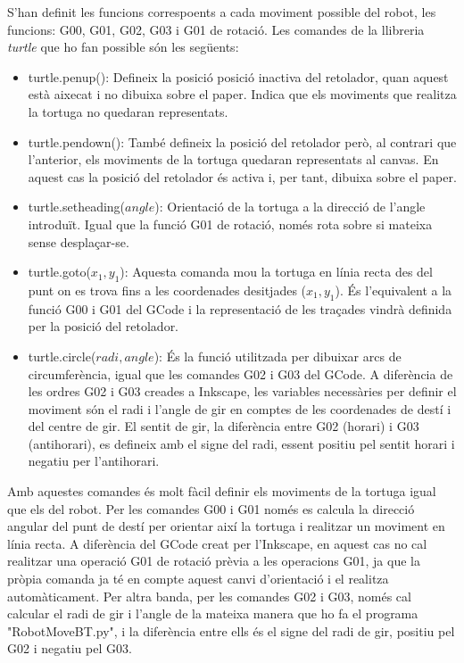 S'han definit les funcions correspoents a cada moviment possible del robot, les funcions: G00, G01, G02, G03 i G01 de rotació. Les comandes de la llibreria \emph{turtle} que ho fan possible són les següents:
\begin{itemize}
	\item turtle.penup(): Defineix la posició posició inactiva del retolador, quan aquest està aixecat i no dibuixa sobre el paper. Indica que els moviments que realitza la tortuga no quedaran representats. 
	
	\item turtle.pendown(): També defineix la posició del retolador però, al contrari que l'anterior, els moviments de la tortuga quedaran representats al canvas. En aquest cas la posició del retolador és activa i, per tant, dibuixa sobre el paper.
	
	\item turtle.setheading($angle$): Orientació de la tortuga a la direcció de l'angle introduït. Igual que la funció G01 de rotació, només rota sobre si mateixa sense desplaçar-se. 
	
	\item turtle.goto($x_{1},y_{1}$): Aquesta comanda mou la tortuga en línia recta des del punt on es trova fins a les coordenades desitjades ($x_{1},y_{1}$). És l'equivalent a la funció G00 i G01 del GCode i la representació de les traçades vindrà definida per la posició del retolador.
	
	\item turtle.circle($radi,angle$): És la funció utilitzada per dibuixar arcs de circumferència, igual que les comandes G02 i G03 del GCode. A diferència de les ordres G02 i G03 creades a Inkscape, les variables necessàries per definir el moviment són el radi i l'angle de gir en comptes de les coordenades de destí i del centre de gir. El sentit de gir, la diferència entre G02 (horari) i G03 (antihorari), es defineix amb el signe del radi, essent positiu pel sentit horari i negatiu per l'antihorari. 
\end{itemize}

Amb aquestes comandes és molt fàcil definir els moviments de la tortuga igual que els del robot. Per les comandes G00 i G01 només es calcula la direcció angular del punt de destí per orientar així la tortuga i realitzar un moviment en línia recta. A diferència del GCode creat per l'Inkscape, en aquest cas no cal realitzar una operació G01 de rotació prèvia a les operacions G01, ja que la pròpia comanda ja té en compte aquest canvi d'orientació i el realitza automàticament. Per altra banda, per les comandes G02 i G03, només cal calcular el radi de gir i l'angle de la mateixa manera que ho fa el programa "RobotMoveBT.py", i la diferència entre ells és el signe del radi de gir, positiu pel G02 i negatiu pel G03. 

